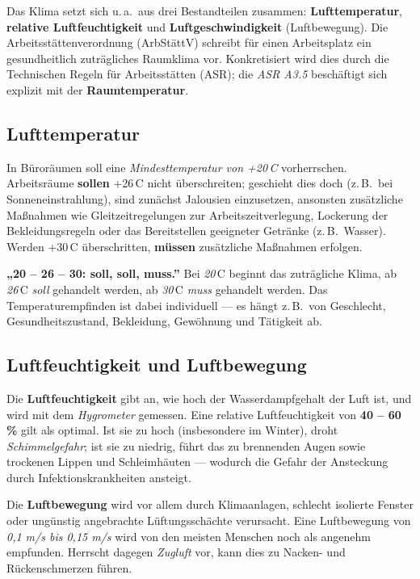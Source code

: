 \documentclass[11pt, a4paper]{article}
\begin{document}
Das Klima setzt sich u.\,a.\ aus drei Bestandteilen zusammen: \textbf{Lufttemperatur},
\textbf{relative Luftfeuchtigkeit} und \textbf{Luftgeschwindigkeit} (Luftbewegung). Die
Arbeitsstättenverordnung (ArbStättV) schreibt für einen Arbeitsplatz ein gesundheitlich
zuträgliches Raumklima vor. Konkretisiert wird dies durch die Technischen Regeln für
Arbeitsstätten (ASR); die \emph{ASR A3.5} beschäftigt sich explizit mit der
\textbf{Raumtemperatur}.

\subsection{Lufttemperatur}

In Büroräumen soll eine \emph{Mindesttemperatur von +20\,\textdegree C} vorherrschen.
Arbeitsräume \textbf{sollen} +26\,\textdegree C nicht überschreiten; geschieht dies doch
(z.\,B.\ bei Sonneneinstrahlung), sind zunächst Jalousien einzusetzen, ansonsten
zusätzliche Maßnahmen wie Gleitzeitregelungen zur Arbeitszeitverlegung, Lockerung der
Bekleidungsregeln oder das Bereitstellen geeigneter Getränke (z.\,B.\ Wasser). Werden
+30\,\textdegree C überschritten, \textbf{müssen} zusätzliche Maßnahmen erfolgen.

\begin{eselsbruecke}
\textbf{„20 -- 26 -- 30: soll, soll, muss.”} Bei \emph{20}\,\textdegree C beginnt das
zuträgliche Klima, ab \emph{26}\,\textdegree C \emph{soll} gehandelt werden, ab
\emph{30}\,\textdegree C \emph{muss} gehandelt werden. Das Temperaturempfinden ist dabei
individuell --- es hängt z.\,B.\ von Geschlecht, Gesundheitszustand, Bekleidung,
Gewöhnung und Tätigkeit ab.
\end{eselsbruecke}

\subsection{Luftfeuchtigkeit und Luftbewegung}

Die \textbf{Luftfeuchtigkeit} gibt an, wie hoch der Wasserdampfgehalt der Luft ist, und
wird mit dem \emph{Hygrometer} gemessen. Eine relative Luftfeuchtigkeit von
\textbf{40 -- 60\,\%} gilt als optimal. Ist sie zu hoch (insbesondere im Winter), droht
\emph{Schimmelgefahr}; ist sie zu niedrig, führt das zu brennenden Augen sowie trockenen
Lippen und Schleimhäuten --- wodurch die Gefahr der Ansteckung durch
Infektionskrankheiten ansteigt.

Die \textbf{Luftbewegung} wird vor allem durch Klimaanlagen, schlecht isolierte Fenster
oder ungünstig angebrachte Lüftungsschächte verursacht. Eine Luftbewegung von
\emph{0,1 m/s bis 0,15 m/s} wird von den meisten Menschen noch als angenehm empfunden.
Herrscht dagegen \emph{Zugluft} vor, kann dies zu Nacken- und Rückenschmerzen führen.
\end{document}
